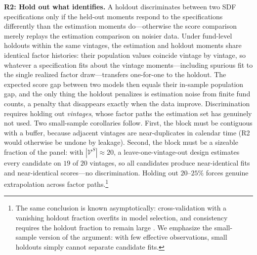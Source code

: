 \documentclass[11pt]{article}
\begin{document}
\textbf{R2: Hold out what identifies.} A holdout discriminates between two SDF specifications only if the held-out moments respond to the specifications differently than the estimation moments do---otherwise the score comparison merely replays the estimation comparison on noisier data. Under fund-level holdouts within the same vintages, the estimation and holdout moments share identical factor histories: their population values coincide vintage by vintage, so whatever a specification fits about the vintage moments---including spurious fit to the single realized factor draw---transfers one-for-one to the holdout. The expected score gap between two models then equals their in-sample population gap, and the only thing the holdout penalizes is estimation noise from finite fund counts, a penalty that disappears exactly when the data improve. Discrimination requires holding out \emph{vintages}, whose factor paths the estimation set has genuinely not used. Two small-sample corollaries follow. First, the block must be contiguous with a buffer, because adjacent vintages are near-duplicates in calendar time (R2 would otherwise be undone by leakage). Second, the block must be a sizeable fraction of the panel: with \(|\mathcal V^S|\approx 20\), a leave-one-vintage-out design estimates every candidate on \(19\) of \(20\) vintages, so all candidates produce near-identical fits and near-identical scores---no discrimination. Holding out \(20\text{--}25\%\) forces genuine extrapolation across factor paths.\footnote{The same conclusion is known asymptotically: cross-validation with a vanishing holdout fraction overfits in model selection, and consistency requires the holdout fraction to remain large \citep{Shao1993,ArlotCelisse2010}. We emphasize the small-sample version of the argument: with few effective observations, small holdouts simply cannot separate candidate fits.}
\end{document}
